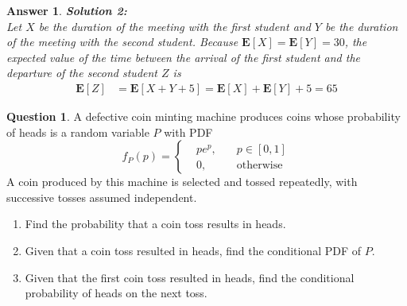 \documentclass[utf8]{article}
\theoremstyle{definition}%
\newtheorem{question}{Question} %
\theoremstyle{plain}%
\newtheorem{answer}{Answer} %
\begin{document}
\begin{answer}
    \textbf{Solution 2:} \\
    Let $X$ be the duration of the meeting with the first student and $Y$ be the duration of the meeting with the second student. Because $\mathbf{E}[X] = \mathbf{E}[Y] = 30$, the expected value of the time between the arrival of the first student and the departure of the second student $Z$ is
    \begin{equation}
    \begin{aligned}
        \mathbf{E}[Z] &= \mathbf{E}[X + Y + 5] = \mathbf{E}[X] + \mathbf{E}[Y] + 5 = 65
    \end{aligned}
    \end{equation}
\end{answer}

\begin{question}
    A defective coin minting machine produces coins whose probability of heads is a random variable $P$ with PDF
    \begin{equation}
        f_{P}(p) = \left\{\begin{aligned}
            &p e^p, \quad &p \in [0, 1] \\ 
            &0, \quad &\text{otherwise}
        \end{aligned}\right.
    \end{equation}
    A coin produced by this machine is selected and tossed repeatedly, with successive tosses assumed independent.
    \begin{enumerate}[label=(\alph*)]
        \item Find the probability that a coin toss results in heads.
        \item Given that a coin toss resulted in heads, find the conditional PDF of $P$.
        \item Given that the first coin toss resulted in heads, find the conditional probability of heads on the next toss.
    \end{enumerate}
\end{question} 
\end{document}
